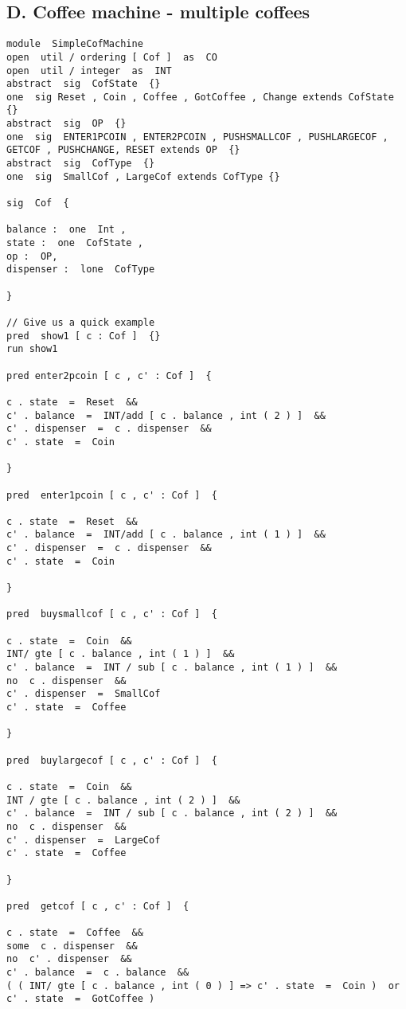 \documentclass[a4paper,12pt]{extarticle}
\begin{document}
\subsection{D. Coffee machine - multiple coffees}
\begin{verbatim}
module  SimpleCofMachine
open  util / ordering [ Cof ]  as  CO
open  util / integer  as  INT
abstract  sig  CofState  {}
one  sig Reset , Coin , Coffee , GotCoffee , Change extends CofState  {}
abstract  sig  OP  {}
one  sig  ENTER1PCOIN , ENTER2PCOIN , PUSHSMALLCOF , PUSHLARGECOF ,
GETCOF , PUSHCHANGE, RESET extends OP  {}
abstract  sig  CofType  {}
one  sig  SmallCof , LargeCof extends CofType {}

sig  Cof  {

balance :  one  Int ,
state :  one  CofState ,
op :  OP,
dispenser :  lone  CofType

}

// Give us a quick example
pred  show1 [ c : Cof ]  {}
run show1

pred enter2pcoin [ c , c' : Cof ]  {

c . state  =  Reset  &&
c' . balance  =  INT/add [ c . balance , int ( 2 ) ]  &&
c' . dispenser  =  c . dispenser  &&
c' . state  =  Coin

}

pred  enter1pcoin [ c , c' : Cof ]  {

c . state  =  Reset  &&
c' . balance  =  INT/add [ c . balance , int ( 1 ) ]  &&
c' . dispenser  =  c . dispenser  &&
c' . state  =  Coin

}

pred  buysmallcof [ c , c' : Cof ]  {

c . state  =  Coin  &&
INT/ gte [ c . balance , int ( 1 ) ]  &&
c' . balance  =  INT / sub [ c . balance , int ( 1 ) ]  &&
no  c . dispenser  &&
c' . dispenser  =  SmallCof
c' . state  =  Coffee

}

pred  buylargecof [ c , c' : Cof ]  {

c . state  =  Coin  &&
INT / gte [ c . balance , int ( 2 ) ]  &&
c' . balance  =  INT / sub [ c . balance , int ( 2 ) ]  &&
no  c . dispenser  &&
c' . dispenser  =  LargeCof
c' . state  =  Coffee

}

pred  getcof [ c , c' : Cof ]  {

c . state  =  Coffee  &&
some  c . dispenser  &&
no  c' . dispenser  &&
c' . balance  =  c . balance  &&
( ( INT/ gte [ c . balance , int ( 0 ) ] => c' . state  =  Coin )  or  c' . state  =  GotCoffee )


\end{verbatim}
\end{document}

